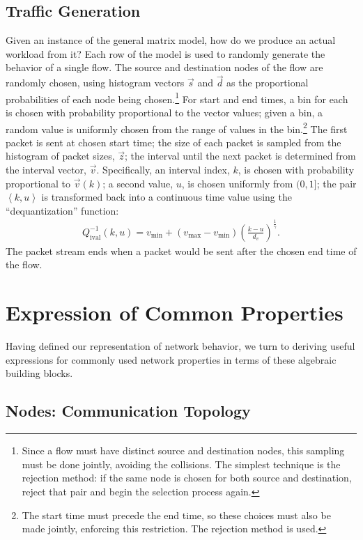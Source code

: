 \documentclass[conference]{IEEEtran}
\newcommand{\Di}{Q^{-1}_{\text{ival}}}
\newcommand{\seq}[1]{\left<#1\right>}
\begin{document}
\subsection{Traffic Generation}

Given an instance of the general matrix model, how do we produce an actual workload from it? Each row of the model is used to randomly generate the behavior of a single flow. The source and destination nodes of the flow are randomly chosen, using histogram vectors $\vec{s}$ and $\vec{d}$ as the proportional probabilities of each node being chosen.\footnote{Since a flow must have distinct source and destination nodes, this sampling must be done jointly, avoiding the collisions. The simplest technique is the rejection method: if the same node is chosen for both source and destination, reject that pair and begin the selection process again.}
For start and end times, a bin for each is chosen with probability proportional to the vector values; given a bin, a random value is uniformly chosen from the range of values in the bin.\footnote{The start time must precede the end time, so these choices must also be made jointly, enforcing this restriction. The rejection method is used.}
The first packet is sent at chosen start time; the size of each packet is sampled from the histogram of packet sizes, $\vec{z}$; the interval until the next packet is determined from the interval vector, $\vec{v}$. Specifically, an interval index, $k$, is chosen with probability proportional to $\vec{v}(k)$; a second value, $u$, is chosen uniformly from $(0,1]$; the pair $\seq{k,u}$ is transformed back into a continuous time value using the ``dequantization'' function:
\begin{align}
\label{eqn:interval-dequantization}
\Di(k,u)=v_{\min}+(v_{\max}-v_{\min})\left(\frac{k-u}{d_v}\right)^{\frac{1}{\gamma}}.
\end{align}
The packet stream ends when a packet would be sent after the chosen end time of the flow.

\section{Expression of Common Properties}

Having defined our representation of network behavior, we turn to deriving useful expressions for commonly used network properties in terms of these algebraic building blocks.

\subsection{Nodes: Communication Topology}
\label{sec:communication-topology}
\end{document}
